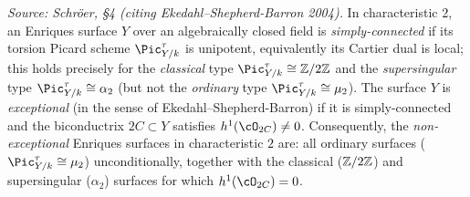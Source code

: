 \begin{definition}
  \label{def:exceptional-enriques}
  \textit{Source: Schr\"oer, §4 (citing Ekedahl--Shepherd-Barron 2004).}
  In characteristic \(2\), an Enriques surface \(Y\) over an algebraically closed field is \emph{simply-connected}
  if its torsion Picard scheme \(\Pic^{\tau}_{Y/k}\) is unipotent, equivalently its Cartier dual is local; this
  holds precisely for the \emph{classical} type \(\Pic^{\tau}_{Y/k} \cong \ZZ/2\ZZ\) and the \emph{supersingular}
  type \(\Pic^{\tau}_{Y/k} \cong \alpha_2\) (but not the \emph{ordinary} type \(\Pic^{\tau}_{Y/k} \cong \mu_2\)).
  The surface \(Y\) is \emph{exceptional} (in the sense of Ekedahl--Shepherd-Barron) if it is simply-connected
  and the biconductrix \(2C \subset Y\) satisfies \(h^1(\cO_{2C}) \neq 0\).
  Consequently, the \emph{non-exceptional} Enriques surfaces in characteristic \(2\) are: all ordinary surfaces
  (\(\Pic^{\tau}_{Y/k} \cong \mu_2\)) unconditionally, together with the classical (\(\mathbb{Z}/2\mathbb{Z}\)) and
  supersingular (\(\alpha_2\)) surfaces for which \(h^1(\cO_{2C}) = 0\).
\end{definition}

